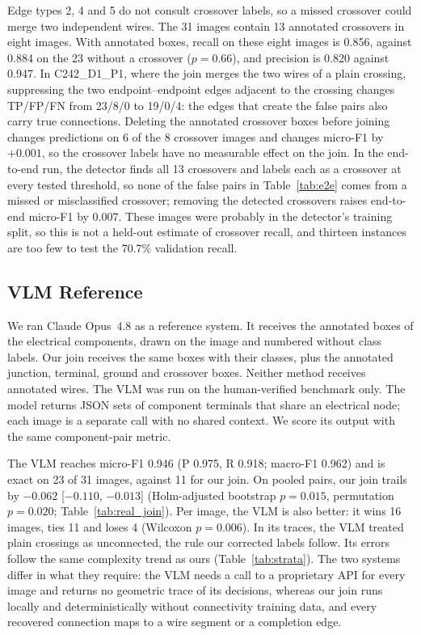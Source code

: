 \documentclass{ieeeaccess}
\begin{document}
Edge types 2, 4 and 5 do not consult crossover labels, so a missed crossover could merge two independent wires. The 31 images contain 13 annotated crossovers in eight images. With annotated boxes, recall on these eight images is 0.856, against 0.884 on the 23 without a crossover ($p=0.66$), and precision is 0.820 against 0.947. In C242\_D1\_P1, where the join merges the two wires of a plain crossing, suppressing the two endpoint--endpoint edges adjacent to the crossing changes TP/FP/FN from 23/8/0 to 19/0/4: the edges that create the false pairs also carry true connections. Deleting the annotated crossover boxes before joining changes predictions on 6 of the 8 crossover images and changes micro-F1 by $+0.001$, so the crossover labels have no measurable effect on the join. In the end-to-end run, the detector finds all 13 crossovers and labels each as a crossover at every tested threshold, so none of the false pairs in Table~\ref{tab:e2e} comes from a missed or misclassified crossover; removing the detected crossovers raises end-to-end micro-F1 by 0.007. These images were probably in the detector's training split, so this is not a held-out estimate of crossover recall, and thirteen instances are too few to test the 70.7\% validation recall.

\subsection{VLM Reference}
\label{sec:vlm_results}

We ran Claude Opus~4.8 as a reference system. It receives the annotated boxes of the electrical components, drawn on the image and numbered without class labels. Our join receives the same boxes with their classes, plus the annotated junction, terminal, ground and crossover boxes. Neither method receives annotated wires. The VLM was run on the human-verified benchmark only. The model returns JSON sets of component terminals that share an electrical node; each image is a separate call with no shared context. We score its output with the same component-pair metric.

The VLM reaches micro-F1 0.946 (P 0.975, R 0.918; macro-F1 0.962) and is exact on 23 of 31 images, against 11 for our join. On pooled pairs, our join trails by $-0.062$ [$-0.110$, $-0.013$] (Holm-adjusted bootstrap $p=0.015$, permutation $p=0.020$; Table~\ref{tab:real_join}). Per image, the VLM is also better: it wins 16 images, ties 11 and loses 4 (Wilcoxon $p=0.006$). In its traces, the VLM treated plain crossings as unconnected, the rule our corrected labels follow. Its errors follow the same complexity trend as ours (Table~\ref{tab:strata}). The two systems differ in what they require: the VLM needs a call to a proprietary API for every image and returns no geometric trace of its decisions, whereas our join runs locally and deterministically without connectivity training data, and every recovered connection maps to a wire segment or a completion edge.
\end{document}
